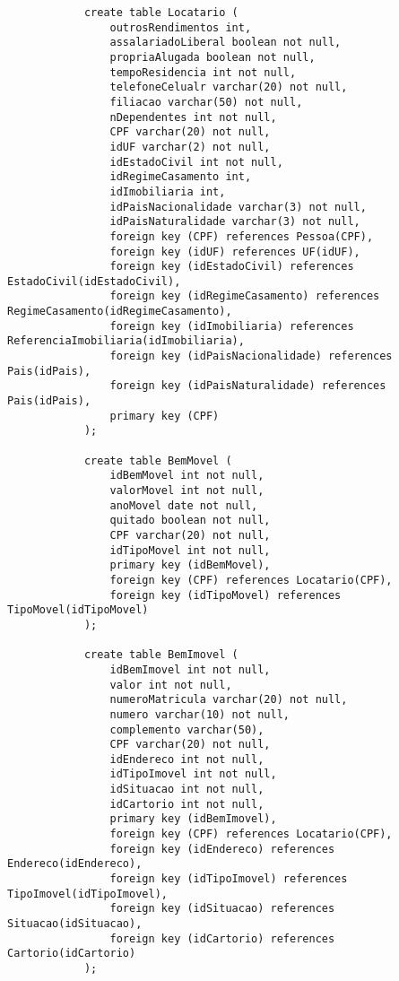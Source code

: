 \documentclass{article}
\begin{document}
\begin{lstlisting}
            create table Locatario (
            	outrosRendimentos int,
            	assalariadoLiberal boolean not null,
            	propriaAlugada boolean not null,
            	tempoResidencia int not null,
            	telefoneCelualr varchar(20) not null,
            	filiacao varchar(50) not null,
            	nDependentes int not null,
            	CPF varchar(20) not null,
            	idUF varchar(2) not null,
            	idEstadoCivil int not null,
            	idRegimeCasamento int,
            	idImobiliaria int,
            	idPaisNacionalidade varchar(3) not null,
            	idPaisNaturalidade varchar(3) not null,
            	foreign key (CPF) references Pessoa(CPF),
            	foreign key (idUF) references UF(idUF),
            	foreign key (idEstadoCivil) references EstadoCivil(idEstadoCivil),
            	foreign key (idRegimeCasamento) references RegimeCasamento(idRegimeCasamento),
            	foreign key (idImobiliaria) references ReferenciaImobiliaria(idImobiliaria),
            	foreign key (idPaisNacionalidade) references Pais(idPais),
            	foreign key (idPaisNaturalidade) references Pais(idPais),
            	primary key (CPF)
            );
            
            create table BemMovel (
            	idBemMovel int not null,
            	valorMovel int not null,
            	anoMovel date not null,
            	quitado boolean not null,
            	CPF varchar(20) not null,
            	idTipoMovel int not null,
            	primary key (idBemMovel),
            	foreign key (CPF) references Locatario(CPF),
            	foreign key (idTipoMovel) references TipoMovel(idTipoMovel)
            );
            
            create table BemImovel (
            	idBemImovel int not null,
            	valor int not null, 
            	numeroMatricula varchar(20) not null,
            	numero varchar(10) not null,
            	complemento varchar(50),
            	CPF varchar(20) not null,
            	idEndereco int not null,
            	idTipoImovel int not null,
            	idSituacao int not null,
            	idCartorio int not null,
            	primary key (idBemImovel),
            	foreign key (CPF) references Locatario(CPF),
            	foreign key (idEndereco) references Endereco(idEndereco),
            	foreign key (idTipoImovel) references TipoImovel(idTipoImovel),
            	foreign key (idSituacao) references Situacao(idSituacao),
            	foreign key (idCartorio) references Cartorio(idCartorio)
            );
            

\end{lstlisting}
\end{document}
